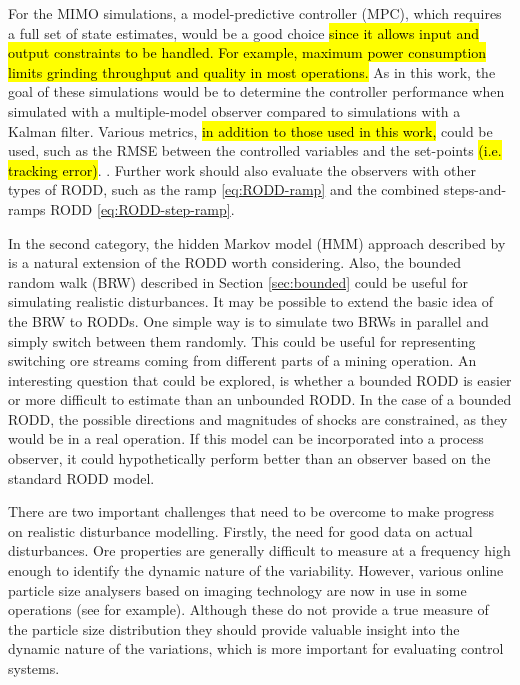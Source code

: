 For the MIMO simulations, a model-predictive controller (\gls{MPC}), which requires a full set of state estimates, would be a good choice \hl{since it allows input and output constraints to be handled. For example, maximum power consumption limits grinding throughput and quality in most operations.} As in this work, the goal of these simulations would be to determine the controller performance when simulated with a multiple-model observer compared to simulations with a Kalman filter. Various metrics, \hl{in addition to those used in this work,} could be used, such as the \gls{RMSE} between the controlled variables and the set-points \hl{(i.e. tracking error)}. . Further work should also evaluate the observers with other types of \gls{RODD}, such as the ramp \eqref{eq:RODD-ramp} and the combined steps-and-ramps \gls{RODD} \eqref{eq:RODD-step-ramp}.

In the second category, the hidden Markov model (\gls{HMM}) approach described by \cite{wong_realistic_2009} is a natural extension of the \gls{RODD} worth considering. Also, the bounded random walk (\gls{BRW}) described in Section \ref{sec:bounded} could be useful for simulating realistic disturbances. It may be possible to extend the basic idea of the \gls{BRW} to \gls{RODD}s. One simple way is to simulate two \gls{BRW}s in parallel and simply switch between them randomly. This could be useful for representing switching ore streams coming from different parts of a mining operation. An interesting question that could be explored, is whether a bounded \gls{RODD} is easier or more difficult to estimate than an unbounded \gls{RODD}. In the case of a bounded \gls{RODD}, the possible directions and magnitudes of shocks are constrained, as they would be in a real operation. If this model can be incorporated into a process observer, it could hypothetically perform better than an observer based on the standard \gls{RODD} model.

There are two important challenges that need to be overcome to make progress on realistic disturbance modelling. Firstly, the need for good data on actual disturbances. Ore properties are generally difficult to measure at a frequency high enough to identify the dynamic nature of the variability. However, various online particle size analysers based on imaging technology are now in use in some operations (see \cite{steyn_investigating_2018} for example). Although these do not provide a true measure of the particle size distribution they should provide valuable insight into the dynamic nature of the variations, which is more important for evaluating control systems. 

